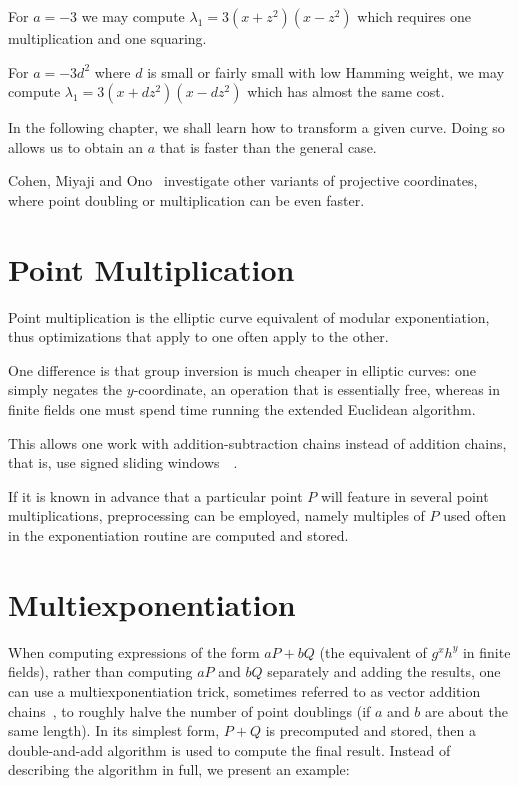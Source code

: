 For $a=-3$ we may compute $\lambda_1 = 3(x+z^2)(x-z^2)$ which requires
one multiplication and one squaring.

For $a = -3 d^2$ where $d$ is small or fairly small with low Hamming weight,
we may compute $\lambda_1 = 3(x+dz^2)(x-dz^2)$ which has almost the same cost.

In the following chapter, we shall learn how to
transform a given curve. Doing so allows us
to obtain an $a$ that is faster than the general case.

Cohen, Miyaji and Ono~\cite{cmo} investigate other variants of projective
coordinates, where point doubling or multiplication can be even faster.

\section {Point Multiplication}

Point multiplication is the elliptic curve equivalent of modular
exponentiation, thus optimizations that apply to one often apply to the other.

One difference is that group inversion is much cheaper in elliptic curves:
one simply negates the $y$-coordinate, an operation that is essentially free,
whereas in finite fields one must spend time running the extended
Euclidean algorithm.

This allows one
work with addition-subtraction chains instead of addition chains, that is,
use signed sliding
windows~\cite[Chapter 14]{handbook}~\cite[Section IV.2.5]{bss}.

If it is known in advance that a particular point $P$ will feature in
several point multiplications, preprocessing can be employed, namely
multiples of $P$ used often in the exponentiation routine
are computed and stored.

\section{Multiexponentiation}

When computing expressions
of the form $a P + b Q$ (the equivalent of $g^x h^y$ in
finite fields), rather than computing $a P$ and $b Q$ separately
and adding the results, one can use
a multiexponentiation trick, sometimes referred to as vector addition chains~\cite[Chapter 14]{handbook},
to roughly halve the number of point doublings
(if $a$ and $b$ are about the same length).
In its simplest form, $P + Q$ is precomputed and stored,
then a double-and-add algorithm is used to compute the
final result. Instead of describing the algorithm in full, we present
an example:


